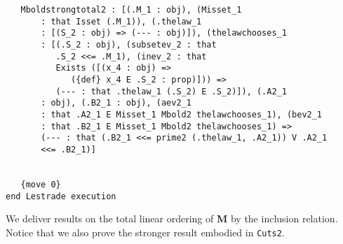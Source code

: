\documentclass[12pt]{article}
\begin{document}
\begin{verbatim}
   Mboldstrongtotal2 : [(.M_1 : obj), (Misset_1 
       : that Isset (.M_1)), (.thelaw_1 
       : [(S_2 : obj) => (--- : obj)]), (thelawchooses_1 
       : [(.S_2 : obj), (subsetev_2 : that 
          .S_2 <<= .M_1), (inev_2 : that 
          Exists ([(x_4 : obj) => 
             ({def} x_4 E .S_2 : prop)])) => 
          (--- : that .thelaw_1 (.S_2) E .S_2)]), (.A2_1 
       : obj), (.B2_1 : obj), (aev2_1 
       : that .A2_1 E Misset_1 Mbold2 thelawchooses_1), (bev2_1 
       : that .B2_1 E Misset_1 Mbold2 thelawchooses_1) => 
       (--- : that (.B2_1 <<= prime2 (.thelaw_1, .A2_1)) V .A2_1 
       <<= .B2_1)]


   {move 0}
end Lestrade execution
\end{verbatim}

We deliver results on the total linear ordering of {\bf M} by the inclusion relation.  Notice that we also prove the stronger result embodied in {\tt Cuts2}.
\end{document}
